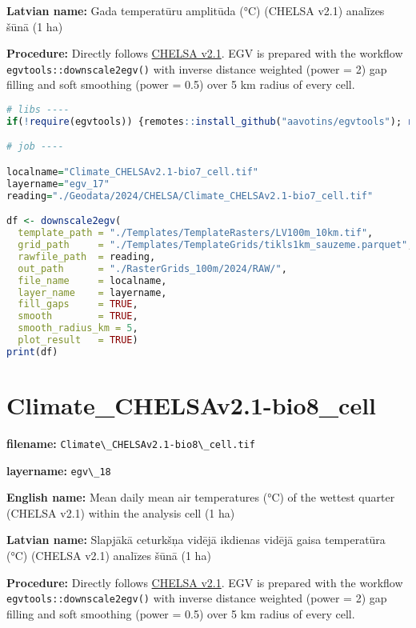 \documentclass[
]{book}
\newcommand{\passthrough}[1]{#1}
\begin{document}
\textbf{Latvian name:} Gada temperatūru amplitūda (°C) (CHELSA v2.1) analīzes šūnā (1 ha)

\textbf{Procedure:} Directly follows \hyperref[Ch04.11]{CHELSA v2.1}. EGV is prepared with the
workflow \passthrough{\lstinline!egvtools::downscale2egv()!} with inverse distance weighted (power = 2)
gap filling and soft smoothing (power = 0.5) over 5 km radius of every cell.

\begin{lstlisting}[language=R]
# libs ----
if(!require(egvtools)) {remotes::install_github("aavotins/egvtools"); require(egvtools)}

# job ----

localname="Climate_CHELSAv2.1-bio7_cell.tif"
layername="egv_17"
reading="./Geodata/2024/CHELSA/Climate_CHELSAv2.1-bio7_cell.tif"

df <- downscale2egv(
  template_path = "./Templates/TemplateRasters/LV100m_10km.tif",
  grid_path     = "./Templates/TemplateGrids/tikls1km_sauzeme.parquet",
  rawfile_path  = reading,
  out_path      = "./RasterGrids_100m/2024/RAW/",
  file_name     = localname,
  layer_name    = layername,
  fill_gaps     = TRUE,
  smooth        = TRUE,
  smooth_radius_km = 5,
  plot_result   = TRUE)
print(df)
\end{lstlisting}

\section{Climate\_CHELSAv2.1-bio8\_cell}\label{ch06.018}

\textbf{filename:} \passthrough{\lstinline!Climate\_CHELSAv2.1-bio8\_cell.tif!}

\textbf{layername:} \passthrough{\lstinline!egv\_18!}

\textbf{English name:} Mean daily mean air temperatures (°C) of the wettest quarter (CHELSA v2.1) within the analysis cell (1 ha)

\textbf{Latvian name:} Slapjākā ceturkšņa vidējā ikdienas vidējā gaisa temperatūra (°C) (CHELSA v2.1) analīzes šūnā (1 ha)

\textbf{Procedure:} Directly follows \hyperref[Ch04.11]{CHELSA v2.1}. EGV is prepared with the
workflow \passthrough{\lstinline!egvtools::downscale2egv()!} with inverse distance weighted (power = 2)
gap filling and soft smoothing (power = 0.5) over 5 km radius of every cell.
\end{document}
